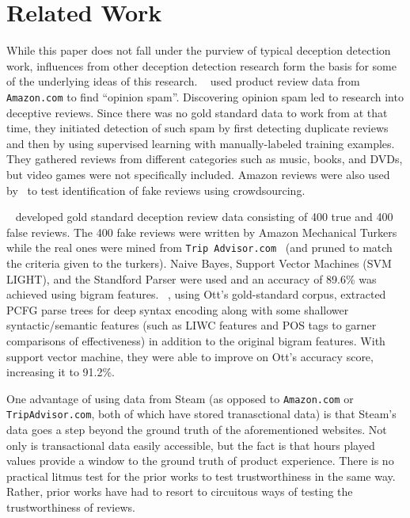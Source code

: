 \documentclass[9pt]{article}
\begin{document}


\section{Related Work}
\label{sec:related}

While this paper does not fall under the purview of typical deception detection work, influences from other deception detection research form the basis for some of the underlying ideas of this research. ~\cite{Jindal:08} used product review data from {\tt Amazon.com} to find ``opinion spam''. Discovering opinion spam led to research into deceptive reviews. Since there was no gold standard data to work from at that time, they initiated detection of such spam by first detecting duplicate reviews and then by using supervised learning with manually-labeled training examples. They gathered reviews from different categories such as music, books, and DVDs, but video games were not specifically included. Amazon reviews were also used by~\cite{Forn:14} to test identification of fake reviews using crowdsourcing.

~\cite{Ott:11} developed gold standard deception review data consisting of 400 true and 400 false reviews. The 400 fake reviews were written by Amazon Mechanical Turkers while the real ones were mined from {\tt Trip Advisor.com } (and pruned to match the criteria given to the turkers). Naive Bayes, Support Vector Machines (SVM LIGHT), and the Standford Parser were used and an accuracy of 89.6\% was achieved using bigram features. ~\cite{Feng:12a}, using Ott's gold-standard corpus, extracted PCFG parse trees for deep syntax encoding along with some shallower syntactic/semantic features (such as LIWC features and POS tags to garner comparisons of effectiveness) in addition to the original bigram features. With support vector machine, they were able to improve on Ott's accuracy score, increasing it to 91.2\%.

One advantage of using data from Steam (as opposed to {\tt Amazon.com} or {\tt TripAdvisor.com}, both of which have stored tranasctional data) is that Steam's data goes a step beyond the ground truth of the aforementioned websites. Not only is transactional data easily accessible, but the fact is that hours played values provide a window to the ground truth of product experience. There is no practical litmus test for the prior works to test trustworthiness in the same way. Rather, prior works have had to resort to circuitous ways of testing the trustworthiness of reviews.
\end{document}
